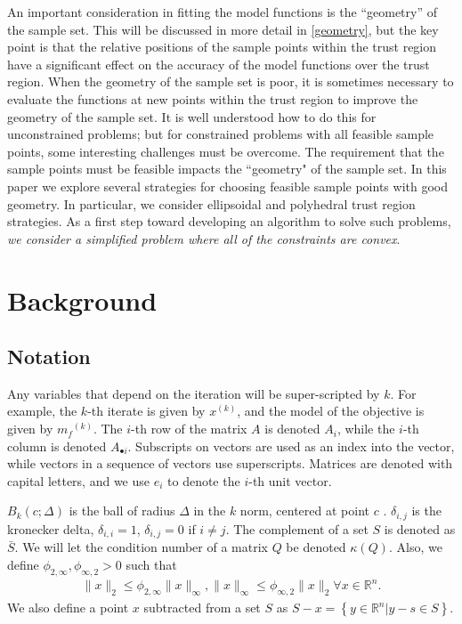 \documentclass{article}
\theoremstyle{case}
\newcommand{\mfk}{{{m}_f}^{(k)}}
\newcommand{\Rn}{\mathbb R^n}
\newcommand{\xk}{{x^{(k)}}}
\begin{document}
An important consideration in fitting the model functions is the ``geometry'' of the sample set.
This will be discussed in more detail in \cref{geometry}, but the key point is that the relative positions of the sample points within the trust region have a significant effect on the accuracy of the model functions over the trust region.
When the geometry of the sample set is poor, it is sometimes necessary to evaluate the functions at new points within the trust region to improve the geometry of the sample set.
It is well understood how to do this for unconstrained problems; but for constrained problems with all feasible sample points, some interesting challenges must be overcome.
The requirement that the sample points must be feasible impacts the ``geometry" of the sample set.
In this paper we explore several strategies for choosing feasible sample points with good geometry.
In particular, we consider ellipsoidal and polyhedral trust region strategies.
As a first step toward developing an algorithm to solve such problems, \emph{we consider a simplified problem where all of the constraints are convex}.


\section{Background}

\subsection{Notation}

Any variables that depend on the iteration will be super-scripted by $k$.
For example, the $k$-th iterate is given by $\xk$, and the model of the objective is given by $\mfk$.
The $i$-th row of the matrix $A$ is denoted $A_i$, while the $i$-th column is denoted $A_{\bullet i}$.
Subscripts on vectors are used as an index into the vector, while vectors in a sequence of vectors use superscripts.
Matrices are denoted with capital letters, and we use $e_i$ to denote the $i$-th unit vector.                     %

$B_k(c; \Delta)$ is the ball of radius $\Delta$ in the $k$ norm, centered at point $c$ .
$\delta_{i,j}$ is the kronecker delta, $\delta_{i,i} = 1$, $\delta_{i,j} = 0$ if $i\ne j$.
The complement of a set $S$ is denoted as $\bar S$.
We will let the condition number of a matrix $Q$ be denoted $\kappa(Q)$.
Also, we define $\phi_{2,\infty},\phi_{\infty,2}>0$ such that 
\begin{align}
\|x\|_2 \le \phi_{2, \infty}\|x\|_{\infty}, \|x\|_{\infty} \le \phi_{\infty,2}\|x\|_2\forall x \in \Rn \label{define_norm_changers}.
\end{align}
We also define a point $x$ subtracted from a set $S$ as $S - x = \left\{y \in \Rn | y - s \in S\right\}$.
\end{document}
